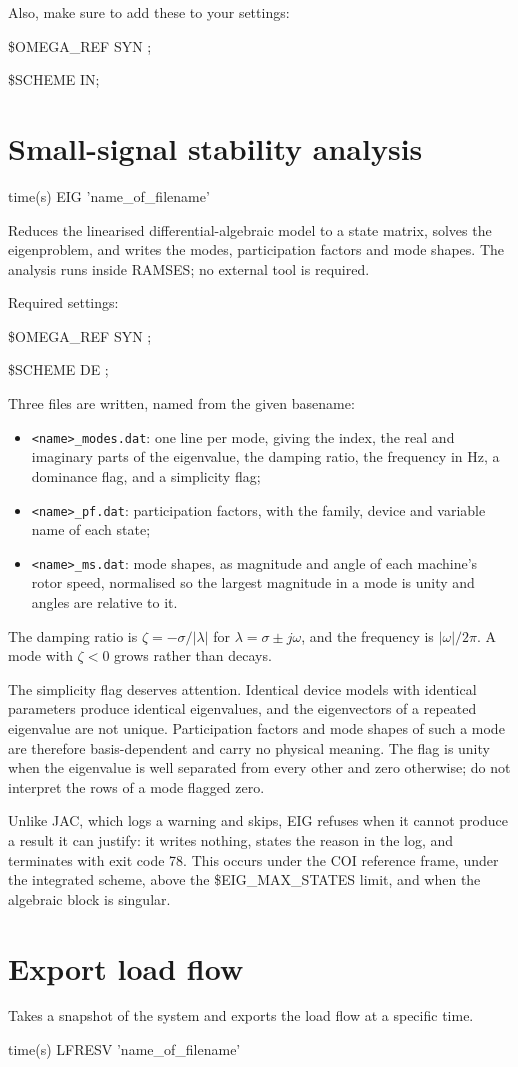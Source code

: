 Also, make sure to add these to your settings:

\$OMEGA\_REF SYN ;
	
\$SCHEME IN;


\section{Small-signal stability analysis}

time(s) EIG 'name\_of\_filename'

Reduces the linearised differential-algebraic model to a state matrix, solves
the eigenproblem, and writes the modes, participation factors and mode shapes.
The analysis runs inside RAMSES; no external tool is required.

Required settings:

\$OMEGA\_REF SYN ;

\$SCHEME DE ;

Three files are written, named from the given basename:

\begin{itemize}
\item {\tt <name>\_modes.dat}: one line per mode, giving the index, the real and
imaginary parts of the eigenvalue, the damping ratio, the frequency in Hz, a
dominance flag, and a simplicity flag;
\item {\tt <name>\_pf.dat}: participation factors, with the family, device and
variable name of each state;
\item {\tt <name>\_ms.dat}: mode shapes, as magnitude and angle of each machine's
rotor speed, normalised so the largest magnitude in a mode is unity and angles
are relative to it.
\end{itemize}

The damping ratio is $\zeta = -\sigma/|\lambda|$ for $\lambda = \sigma \pm
j\omega$, and the frequency is $|\omega|/2\pi$. A mode with $\zeta < 0$ grows
rather than decays.

The simplicity flag deserves attention. Identical device models with identical
parameters produce identical eigenvalues, and the eigenvectors of a repeated
eigenvalue are not unique. Participation factors and mode shapes of such a mode
are therefore basis-dependent and carry no physical meaning. The flag is unity
when the eigenvalue is well separated from every other and zero otherwise; do
not interpret the rows of a mode flagged zero.

Unlike JAC, which logs a warning and skips, EIG refuses when it cannot produce a
result it can justify: it writes nothing, states the reason in the log, and
terminates with exit code 78. This occurs under the COI reference frame, under
the integrated scheme, above the \$EIG\_MAX\_STATES limit, and when the
algebraic block is singular.

\section{Export load flow}

Takes a snapshot of the system and exports the load flow at a specific time.

time(s) LFRESV 'name\_of\_filename' 